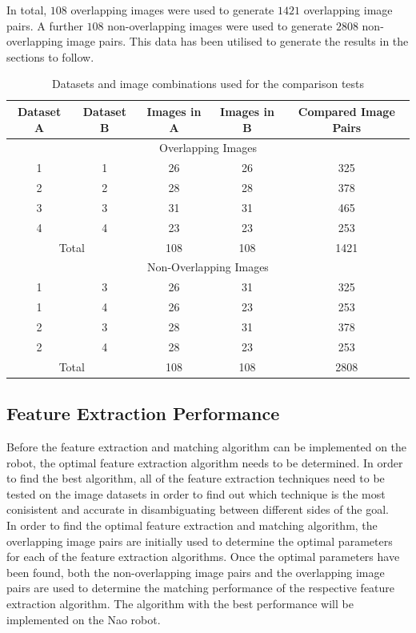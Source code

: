 \documentclass{article}
\begin{document}
In total, $108$ overlapping images were used to generate $1421$ overlapping image pairs. A further $108$ non-overlapping images were used to generate $2808$ non-overlapping image pairs. This data has been utilised to generate the results in the sections to follow. \\ 

\begin{table}
\caption{Datasets and image combinations used for the comparison tests}
\begin{tabular}{|c|c|c|c|c|}
\hline 
Dataset A & Dataset B & Images in A & Images in B & Compared Image Pairs\tabularnewline
\hline 
\hline 
\multicolumn{5}{|c}{Overlapping Images}\tabularnewline
\hline 
1 & 1 & 26 & 26 & 325\tabularnewline
\hline 
2 & 2 & 28 & 28 & 378\tabularnewline
\hline 
3 & 3 & 31 & 31 & 465\tabularnewline
\hline 
4 & 4 & 23 & 23 & 253\tabularnewline
\hline 
\multicolumn{2}{|c|}{Total} & 108 & 108 & 1421\tabularnewline
\hline 
\multicolumn{5}{|c}{Non-Overlapping Images}\tabularnewline
\hline 
1 & 3 & 26 & 31 & 325\tabularnewline
\hline 
1 & 4 & 26 & 23 & 253\tabularnewline
\hline 
2 & 3 & 28 & 31 & 378\tabularnewline
\hline 
2 & 4 & 28 & 23 & 253\tabularnewline
\hline 
\multicolumn{2}{|c|}{Total} & 108 & 108 & 2808\tabularnewline
\hline 
\end{tabular}
\label{table:overlap}
\end{table}

\subsection{Feature Extraction Performance}
\label{sec:featureExtraction}
Before the feature extraction and matching algorithm can be implemented on the robot, the optimal feature extraction algorithm needs to be determined. In order to find the best algorithm, all of the feature extraction techniques need to be tested on the image datasets in order to find out which technique is the most conisistent and accurate in disambiguating between different sides of the goal. \\

In order to find the optimal feature extraction and matching algorithm, the overlapping image pairs are initially used to determine the optimal parameters for each of the feature extraction algorithms. Once the optimal parameters have been found, both the non-overlapping image pairs and the overlapping image pairs are used to determine the matching performance of the respective feature extraction algorithm. The algorithm with the best performance will be implemented on the Nao robot.\\
\end{document}
